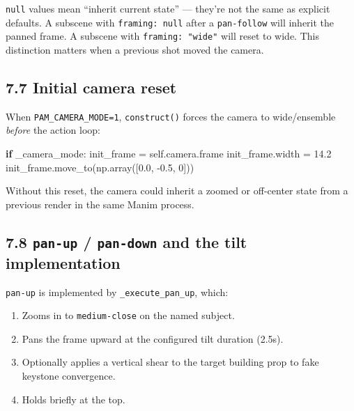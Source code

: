 \documentclass[
  11pt,
]{book}
\newenvironment{Shaded}{}{}
\newcommand{\ControlFlowTok}[1]{\textcolor[rgb]{0.00,0.44,0.13}{\textbf{#1}}}
\newcommand{\DecValTok}[1]{\textcolor[rgb]{0.25,0.63,0.44}{#1}}
\newcommand{\FloatTok}[1]{\textcolor[rgb]{0.25,0.63,0.44}{#1}}
\newcommand{\NormalTok}[1]{#1}
\newcommand{\OperatorTok}[1]{\textcolor[rgb]{0.40,0.40,0.40}{#1}}
\newcommand{\VariableTok}[1]{\textcolor[rgb]{0.10,0.09,0.49}{#1}}
\providecommand{\tightlist}{%
  \setlength{\itemsep}{0pt}\setlength{\parskip}{0pt}}
\begin{document}
\texttt{null} values mean ``inherit current state'' --- they're not the
same as explicit defaults. A subscene with \texttt{framing:\ null} after
a \texttt{pan-follow} will inherit the panned frame. A subscene with
\texttt{framing:\ "wide"} will reset to wide. This distinction matters
when a previous shot moved the camera.

\subsection{7.7 Initial camera reset}\label{initial-camera-reset}

When \texttt{PAM\_CAMERA\_MODE=1}, \texttt{construct()} forces the
camera to wide/ensemble \emph{before} the action loop:

\begin{Shaded}
\begin{Highlighting}[]
\ControlFlowTok{if}\NormalTok{ \_camera\_mode:}
\NormalTok{    init\_frame }\OperatorTok{=} \VariableTok{self}\NormalTok{.camera.frame}
\NormalTok{    init\_frame.width }\OperatorTok{=} \FloatTok{14.2}
\NormalTok{    init\_frame.move\_to(np.array([}\FloatTok{0.0}\NormalTok{, }\OperatorTok{{-}}\FloatTok{0.5}\NormalTok{, }\DecValTok{0}\NormalTok{]))}
\end{Highlighting}
\end{Shaded}

Without this reset, the camera could inherit a zoomed or off-center
state from a previous render in the same Manim process.

\subsection{\texorpdfstring{7.8 \texttt{pan-up} / \texttt{pan-down} and
the tilt
implementation}{7.8 pan-up / pan-down and the tilt implementation}}\label{pan-up-pan-down-and-the-tilt-implementation}

\texttt{pan-up} is implemented by \texttt{\_execute\_pan\_up}, which:

\begin{enumerate}
\def\labelenumi{\arabic{enumi}.}
\tightlist
\item
  Zooms in to \texttt{medium-close} on the named subject.
\item
  Pans the frame upward at the configured tilt duration (2.5s).
\item
  Optionally applies a vertical shear to the target building prop to
  fake keystone convergence.
\item
  Holds briefly at the top.
\end{enumerate}
\end{document}
